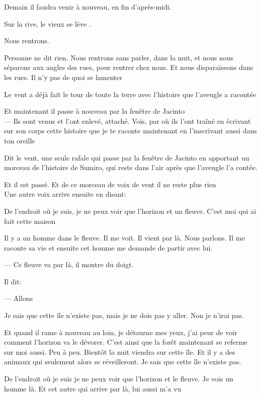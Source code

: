 Demain il faudra venir à nouveau, en fin d'après-midi.

Sur la rive, le vieux se lève .

Nous rentrons.

Personne ne dit rien. Nous rentrons sans parler, dans la nuit, et nous
nous séparons aux angles des rues, pour rentrer chez nous. Et nous
disparaissons dans les rues. Il n'y pas de quoi se lamenter

\clearpage
\thispagestyle{empty}
\movetoevenpage

\vspace*{4cm}

Le vent a déjà fait le tour de toute la terre avec l'histoire que
l'aveugle a racontée

Et maintenant il passe à nouveau par la fenêtre de Jacinto\\

--- Ils sont venus et l'ont enlevé, attaché. Vois, par où ils l'ont traîné
en écrivant sur son corps cette histoire que je te raconte maintenant en
l'inscrivant aussi dans ton oreille

Dit le vent, une seule rafale qui passe par la fenêtre de Jacinto en
apportant un morceau de l'histoire de Sumiro, qui reste dans l'air après
que l'aveugle l'a contée.

Et il est passé. Et de ce morceau de voix de vent il ne reste plus rien\\

Une autre voix arrive ensuite en disant:

De l'endroit où je suis, je ne peux voir que l'horizon et un fleuve.
C'est moi qui ai fait cette maison

Il y a un homme dans le fleuve. Il me voit. Il vient par là. Nous
parlons. Il me raconte sa vie et ensuite cet homme me demande de partir
avec lui.

--- Ce fleuve va par là, il montre du doigt.

Il dit:

--- Allons

Je sais que cette île n'existe pas, mais je ne dois pas y aller. Non je
n'irai pas.

Et quand il rame à nouveau au loin, je détourne mes yeux, j'ai peur de
voir comment l'horizon va le dévorer. C'est ainsi que la forêt
maintenant se referme sur moi aussi. Peu à peu. Bientôt la nuit viendra
sur cette île. Et il y a des animaux qui seulement alors se
réveilleront. Je sais que cette île n'existe pas.

De l'endroit où je suis je ne peux voir que l'horizon et le fleuve. Je
vois un homme là. Et cet autre qui arrive par là, lui aussi m'a vu\\

